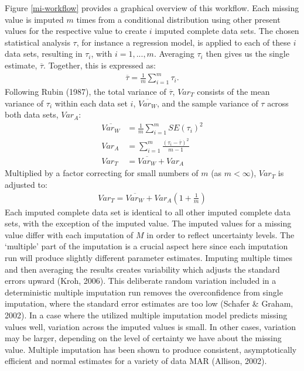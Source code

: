\documentclass[12pt,econ]{sources/authesis}
\begin{document}
Figure \ref{mi-workflow} provides a graphical overview of this workflow. Each missing value is imputed \(m\) times from a conditional distribution using other present values for the respective value to create \(i\) imputed complete data sets. The chosen statistical analysis \(\tau\), for instance a regression model, is applied to each of these \(i\) data sets, resulting in \(\tau_{i}\), with \(i = 1, ..., m\). Averaging \(\tau_{i}\) then gives us the single estimate, \(\overline{\tau}\). Together, this is expressed as:
\begin{align}
\overline{\tau} = \frac{1}{m}\sum\limits_{i=1}^{m} \tau_{i}.
\end{align}
Following Rubin (1987), the total variance of \(\overline{\tau}\), \(Var_T\) consists of the mean variance of \(\tau_i\) within each data set \(i\), \(\overline{Var_W}\), and the sample variance of \(\tau\) across both data sets, \(Var_A\):
\begin{align}
\overline{Var_W} &= \frac{1}{m} \sum\limits_{i=1}^{m} SE(\tau_i)^2\\
Var_A &= \sum\limits_{i=1}^{m} \frac{(\tau_{i} - \overline{\tau})^2}{m -1}\\
Var_T &= \overline{Var_W} + Var_A
\end{align}
Multiplied by a factor correcting for small numbers of \(m\) (as \(m < \infty\)), \(Var_T\) is adjusted to:
\begin{align}
Var_T = \overline{Var_W} + Var_A (1 + \frac{1}{m})
\end{align}
Each imputed complete data set is identical to all other imputed complete data sets, with the exception of the imputed value. The imputed values for a missing value differ with each imputation of \(M\) in order to reflect uncertainty levels. The `multiple' part of the imputation is a crucial aspect here since each imputation run will produce slightly different parameter estimates. Imputing multiple times and then averaging the results creates variability which adjusts the standard errors upward (Kroh, 2006). This deliberate random variation included in a deterministic multiple imputation run removes the overconfidence from single imputation, where the standard error estimates are too low (Schafer \& Graham, 2002). In a case where the utilized multiple imputation model predicts missing values well, variation across the imputed values is small. In other cases, variation may be larger, depending on the level of certainty we have about the missing value. Multiple imputation has been shown to produce consistent, asymptotically efficient and normal estimates for a variety of data MAR (Allison, 2002).
\end{document}
